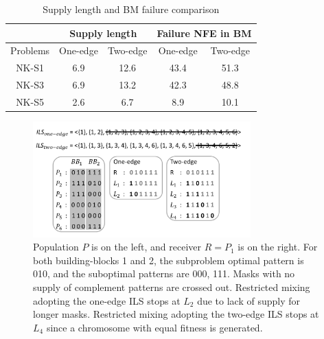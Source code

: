 \documentclass{sig-alternate-05-2015}
\begin{document}
\begin{table}[ht]
\begin{tabular}{|c|c|c|c|c|}
\hline
 &
\multicolumn{2}{c|}{Supply length} &
\multicolumn{2}{c|}{Failure NFE in BM} \\
\hline
Problems  & One-edge & Two-edge & One-edge & Two-edge \\\hline
NK-S1 &  6.9 &12.6  &43.4 & 51.3 \\\hline
NK-S3 & 6.9  & 13.2  &42.3 & 48.8 \\\hline
NK-S5 & 2.6  &6.7  &  8.9& 10.1 \\\hline

\end{tabular}
\caption{Supply length and BM failure comparison}
\end{table}

\begin{figure}
\centering
\includegraphics[width=3.3in]{SupplyBound}
\caption{Population $ P $ is on the left, and receiver $ R  = P_{1} $ is on the right. For both building-blocks 1 and 2, the subproblem optimal pattern is 010, and the suboptimal patterns are 000, 111. Masks with no supply of complement patterns are crossed out. Restricted mixing adopting the one-edge ILS stops at $ L_{2}$ due to lack of supply for longer masks. Restricted mixing adopting the two-edge ILS stops at $ L_{4} $ since a chromosome with equal fitness is generated.}
\end{figure}
\end{document}
